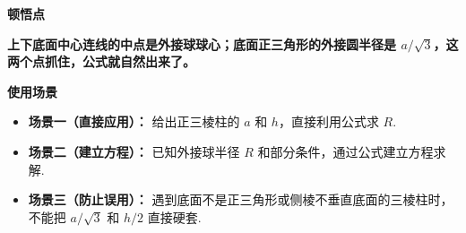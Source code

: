 \begin{explanationbox}
	\medskip
	\textbf{\textcolor{CExplanation}{顿悟点}}

	\textbf{上下底面中心连线的中点是外接球球心；底面正三角形的外接圆半径是 $a/\sqrt3$，这两个点抓住，公式就自然出来了。}

	\medskip
	\textbf{\textcolor{CExplanation}{使用场景}}
	\begin{itemize}[leftmargin=*, itemsep=0.5em, topsep=0.4em]
		\item \textbf{场景一（直接应用）：} 给出正三棱柱的 $a$ 和 $h$，直接利用公式求 $R$.
		\item \textbf{场景二（建立方程）：} 已知外接球半径 $R$ 和部分条件，通过公式建立方程求解.
		\item \textbf{场景三（防止误用）：} 遇到底面不是正三角形或侧棱不垂直底面的三棱柱时，不能把 $a/\sqrt3$ 和 $h/2$ 直接硬套.
	\end{itemize}
\end{explanationbox}